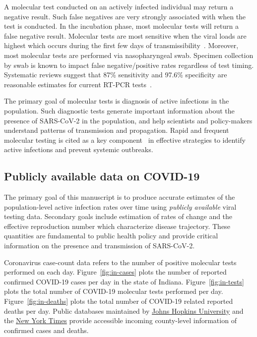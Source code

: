 \documentclass[11pt]{amsart}
\numberwithin{equation}{section}
\theoremstyle{plain}
\begin{document}
 A molecular test conducted on an actively infected individual may return a negative result.  Such false negatives are very strongly associated with when the test is conducted.  In the incubation phase, most molecular tests will return a false negative result.  Molecular tests are most sensitive when the viral loads are highest which occurs during the first few days of transmissibility~\citep{Mina2020}.   Moreover, most molecular tests are performed via nasopharyngeal swab.  Specimen collection by swab is known to impact false negative/positive rates regardless of test timing.   Systematic reviews suggest that 87\% sensitivity and 97.6\% specificity are reasonable estimates for current RT-PCR tests~\citep{Arevalo2020, Woloshin2020,Cohen2020}.

 The primary goal of molecular tests is diagnosis of active infections in the population.  Such diagnostic tests generate important information about the presence of SARS-CoV-2 in the population, and help scientists and policy-makers understand patterns of transmission and propagation. Rapid and frequent molecular testing is cited as a key component~\citep{OECD2021} in effective strategies to identify active infections and prevent systemic outbreaks.

 \subsection{Publicly available data on COVID-19}
 \label{subsection:testinginfo}

 The primary goal of this manuscript is to produce accurate estimates of the population-level active infection rates over time using \emph{publicly available} viral testing data.  Secondary goals include estimation of rates of change and the effective reproduction number which characterize disease trajectory.
 These quantities are fundamental to public health policy and provide critical information on the presence and transmission of SARS-CoV-2.



 Coronavirus case-count data refers to the number of positive molecular tests performed on each day.  Figure~\ref{fig:in-cases} plots the number of reported confirmed COVID-19 cases per day in the state of Indiana.  Figure~\ref{fig:in-tests} plots the total number of COVID-19 molecular tests performed per day. Figure~\ref{fig:in-deaths} plots the total number of COVID-19 related reported deaths per day. Public databases maintained by \href{https://bit.ly/2UqFSuA}{Johns Hopkins University} and the \href{https://bit.ly/2vUHfrK}{New York Times} provide accessible incoming county-level information of confirmed cases and deaths.
\end{document}
